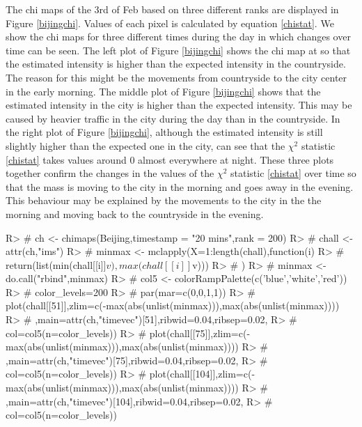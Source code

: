 \documentclass[article]{jss}
\begin{document}
  The chi maps of the 3rd of Feb based on three different ranks are displayed in Figure \ref{bijingchi}. Values of each pixel is calculated by equation \eqref{chistat}.  We show the chi maps for three different times during the day in which changes over time can be seen. The left plot of Figure \ref{bijingchi} shows the chi map at  so that the estimated intensity is higher than the expected intensity in the countryside. The reason for this might be the movements from countryside to the city center in the early morning. The middle plot of Figure \ref{bijingchi} shows that the estimated intensity in the city is higher than the expected intensity. This may be caused  by heavier traffic in the city during the day than in the countryside. In the right plot of Figure \ref{bijingchi}, although the estimated intensity is still slightly higher than the expected one in the city, can see that the $\chi^2$ statistic \eqref{chistat} takes values around 0 almost everywhere at night. These three plots together confirm the changes in the values of the $\chi^2$ statistic \eqref{chistat} over time so that the mass is moving to the city in the morning and goes away in the evening. This behaviour may be explained by the movements to the city in the the morning and moving back to the countryside in the evening.

\begin{Schunk}
\begin{Sinput}
R> # ch <- chimaps(Beijing,timestamp = "20 mins",rank = 200)
R> # chall <- attr(ch,"ims")
R> # minmax <- mclapply(X=1:length(chall),function(i){
R> #     return(list(min(chall[[i]]$v),max(chall[[i]]$v)))
R> #   })
R> # minmax <- do.call("rbind",minmax)
R> # col5 <- colorRampPalette(c('blue','white','red'))
R> # color_levels=200 
R> # par(mar=c(0,0,1,1))
R> # plot(chall[[51]],zlim=c(-max(abs(unlist(minmax))),max(abs(unlist(minmax))))
R> #           ,main=attr(ch,"timevec")[51],ribwid=0.04,ribsep=0.02,
R> #           col=col5(n=color_levels))
R> # plot(chall[[75]],zlim=c(-max(abs(unlist(minmax))),max(abs(unlist(minmax))))
R> #           ,main=attr(ch,"timevec")[75],ribwid=0.04,ribsep=0.02,
R> #           col=col5(n=color_levels))
R> # plot(chall[[104]],zlim=c(-max(abs(unlist(minmax))),max(abs(unlist(minmax))))
R> #           ,main=attr(ch,"timevec")[104],ribwid=0.04,ribsep=0.02,
R> #           col=col5(n=color_levels))
\end{Sinput}
\end{Schunk}
\end{document}
